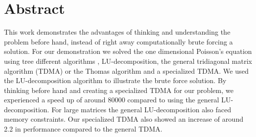 \section*{Abstract}
This work demonstrates the advantages of thinking and understanding the problem
before hand, instead of right away computationally brute forcing a solution. For
our demonstration we 
solved the one dimensional Poisson's equation using tree different algorithms
, LU-decomposition, the general tridiagonal matrix algorithm (TDMA) or the
Thomas algorithm \cite{tridia} and a specialized TDMA.
We used the LU-decomposition algorithm to illustrate the brute force solution.
By thinking before hand and creating a specialized TDMA for our problem, we
experienced a speed up 
of around 80000 compared to using the general LU-decomposition. For large
matrices the general LU-decomposition also faced memory constraints. Our
specialized TDMA also showed an increase of around 2.2 in performance compared to the general TDMA.     